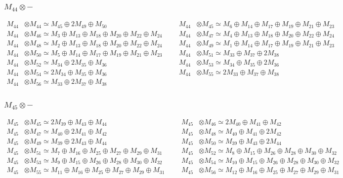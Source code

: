 \subsubsection{$ M_{44}\otimes -$}
\begin{align*}
M_{44} &\otimes M_{44} \simeq M_{45} \oplus 2M_{49} \oplus M_{50} &&& M_{44} &\otimes M_{45} \simeq M_{6} \oplus M_{14} \oplus M_{17} \oplus M_{19} \oplus M_{21} \oplus M_{23}\\
M_{44} &\otimes M_{46} \simeq M_{3} \oplus M_{13} \oplus M_{18} \oplus M_{20} \oplus M_{22} \oplus M_{24} &&& M_{44} &\otimes M_{47} \simeq M_{4} \oplus M_{13} \oplus M_{18} \oplus M_{20} \oplus M_{22} \oplus M_{24}\\
M_{44} &\otimes M_{48} \simeq M_{2} \oplus M_{13} \oplus M_{18} \oplus M_{20} \oplus M_{22} \oplus M_{24} &&& M_{44} &\otimes M_{49} \simeq M_{1} \oplus M_{14} \oplus M_{17} \oplus M_{19} \oplus M_{21} \oplus M_{23}\\
M_{44} &\otimes M_{50} \simeq M_{5} \oplus M_{14} \oplus M_{17} \oplus M_{19} \oplus M_{21} \oplus M_{23} &&& M_{44} &\otimes M_{51} \simeq M_{33} \oplus M_{37} \oplus 2M_{38}\\
M_{44} &\otimes M_{52} \simeq M_{34} \oplus 2M_{35} \oplus M_{36} &&& M_{44} &\otimes M_{53} \simeq M_{34} \oplus M_{35} \oplus 2M_{36}\\
M_{44} &\otimes M_{54} \simeq 2M_{34} \oplus M_{35} \oplus M_{36} &&& M_{44} &\otimes M_{55} \simeq 2M_{33} \oplus M_{37} \oplus M_{38}\\
M_{44} &\otimes M_{56} \simeq M_{33} \oplus 2M_{37} \oplus M_{38}
\end{align*}

\subsubsection{$ M_{45}\otimes -$}
\begin{align*}
M_{45} &\otimes M_{45} \simeq 2M_{39} \oplus M_{43} \oplus M_{44} &&& M_{45} &\otimes M_{46} \simeq 2M_{40} \oplus M_{41} \oplus M_{42}\\
M_{45} &\otimes M_{47} \simeq M_{40} \oplus 2M_{41} \oplus M_{42} &&& M_{45} &\otimes M_{48} \simeq M_{40} \oplus M_{41} \oplus 2M_{42}\\
M_{45} &\otimes M_{49} \simeq M_{39} \oplus 2M_{43} \oplus M_{44} &&& M_{45} &\otimes M_{50} \simeq M_{39} \oplus M_{43} \oplus 2M_{44}\\
M_{45} &\otimes M_{51} \simeq M_{7} \oplus M_{16} \oplus M_{25} \oplus M_{27} \oplus M_{29} \oplus M_{31} &&& M_{45} &\otimes M_{52} \simeq M_{8} \oplus M_{15} \oplus M_{26} \oplus M_{28} \oplus M_{30} \oplus M_{32}\\
M_{45} &\otimes M_{53} \simeq M_{9} \oplus M_{15} \oplus M_{26} \oplus M_{28} \oplus M_{30} \oplus M_{32} &&& M_{45} &\otimes M_{54} \simeq M_{10} \oplus M_{15} \oplus M_{26} \oplus M_{28} \oplus M_{30} \oplus M_{32}\\
M_{45} &\otimes M_{55} \simeq M_{11} \oplus M_{16} \oplus M_{25} \oplus M_{27} \oplus M_{29} \oplus M_{31} &&& M_{45} &\otimes M_{56} \simeq M_{12} \oplus M_{16} \oplus M_{25} \oplus M_{27} \oplus M_{29} \oplus M_{31}\\
\end{align*}

